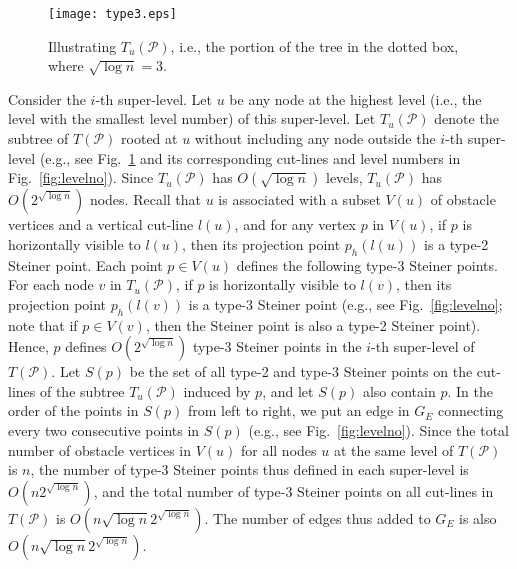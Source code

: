 \documentclass[english,runningheads,11pt]{llncs}
\def\calP{\mathcal{P}}
\begin{document}
\begin{figure}[t]
\begin{minipage}[t]{\linewidth}
\begin{center}
\texttt{[image: type3.eps]}
\caption{\footnotesize Illustrating $T_u(\calP)$, i.e., the portion of the tree in the dotted box, where $\sqrt{\log n}=3$. }
\label{fig:type3}
\end{center}
\end{minipage}
\vspace*{-0.15in}
\end{figure}

Consider the $i$-th super-level.
Let $u$ be any node at the highest level (i.e., the level with the smallest level number) of this super-level. Let
$T_u(\calP)$ denote the subtree of $T(\calP)$ rooted at $u$ without including
any node outside the $i$-th super-level (e.g., see Fig.~\ref{fig:type3} and its corresponding cut-lines and level numbers in Fig.~\ref{fig:levelno}). Since $T_u(\calP)$ has
$O(\sqrt{\log n})$ levels, $T_u(\calP)$ has
$O(2^{\sqrt{\log n}})$ nodes. Recall that $u$ is associated with a
subset $V(u)$ of obstacle vertices and a vertical cut-line $l(u)$, and for any vertex $p$
in $V(u)$, if $p$ is horizontally visible to
$l(u)$, then its projection point $p_h(l(u))$ is a type-2 Steiner
point. Each point $p\in V(u)$ defines the following type-3 Steiner points. For
each node $v$ in $T_u(\calP)$, if $p$ is horizontally visible to
$l(v)$, then its projection point $p_h(l(v))$ is a type-3 Steiner
point (e.g., see Fig.~\ref{fig:levelno}; note that if $p\in V(v)$, then the Steiner point is also a type-2 Steiner point).
Hence, $p$ defines $O(2^{\sqrt{\log n}})$ type-3 Steiner
points in the $i$-th super-level of $T(\calP)$. Let $S(p)$ be the set of all
type-2 and type-3 Steiner points on the cut-lines of the subtree
$T_u(\calP)$ induced by $p$, and let $S(p)$ also contain $p$. In the order of the
points in $S(p)$ from left to right, we put an edge in
$G_E$ connecting every two consecutive points in $S(p)$ (e.g., see Fig.~\ref{fig:levelno}).
Since the total number of obstacle vertices in $V(u)$ for all nodes $u$
at the same level of $T(\calP)$ is $n$, the number of type-3
Steiner points thus defined in each super-level is $O(n2^{\sqrt{\log
n}})$, and the total number of type-3 Steiner points on all cut-lines
in $T(\calP)$ is $O(n\sqrt{\log n}2^{\sqrt{\log n}})$. The number of edges
thus added to $G_E$ is also $O(n\sqrt{\log n}2^{\sqrt{\log n}})$.
\end{document}
